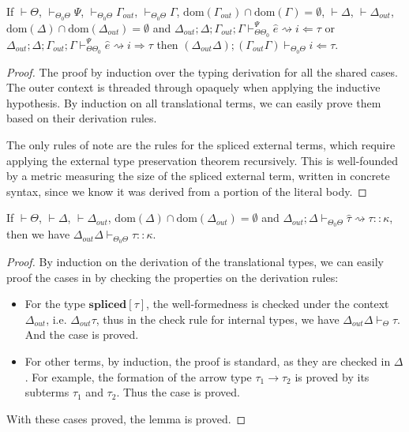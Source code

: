 \documentclass{sig-alternate}[10pt]
\begin{document}
\begin{lemma}
If $\vdash\Theta$, $\vdash_{\Theta_0\Theta} \Psi$, $\vdash_{\Theta_0\Theta}\Gamma_{out}$, $\vdash_{\Theta_0\Theta}\Gamma$, $\text{dom}(\Gamma_{out})\cap \text{dom}(\Gamma)=\emptyset$, $\vdash\Delta$, $\vdash\Delta_{out}$, $\text{dom}(\Delta)\cap\text{dom}(\Delta_{out})=\emptyset$ and $\Delta_{out};\Delta;\Gamma_{out};\Gamma\vdash_{\Theta\Theta_0}^{\Psi}\hat{e}\rightsquigarrow i\Leftarrow\tau$ or $\Delta_{out};\Delta;\Gamma_{out};\Gamma\vdash_{\Theta\Theta_0}^{\Psi}\hat{e}\rightsquigarrow i\Rightarrow \tau$ then $(\Delta_{out}\Delta);(\Gamma_{out}\Gamma)\vdash_{\Theta_0\Theta}i\Leftarrow \tau$.
\end{lemma}
\begin{proof}
The proof by induction over the typing derivation for all the shared cases. The outer context is threaded through opaquely when applying the inductive hypothesis. By induction on all translational terms, we can easily prove them based on their derivation rules.

The only rules of note are the rules for the spliced external terms, which require applying the external type preservation theorem recursively.
This is well-founded by a metric measuring the size of the spliced external term, written
in concrete syntax, since we know it was derived from a portion of the literal body.
\end{proof}

\begin{lemma}
If $\vdash\Theta$, $\vdash\Delta$, $\vdash\Delta_{out}$, $\text{dom}(\Delta)\cap\text{dom}(\Delta_{out})=\emptyset$ and $\Delta_{out};\Delta\vdash_{\Theta_0\Theta}\hat\tau\rightsquigarrow\tau::\kappa$, then we have $\Delta_{out}\Delta\vdash_{\Theta_0\Theta}\tau::\kappa$.
\end{lemma}
\begin{proof}
By induction on the derivation of the translational types, we can easily proof the cases in by checking the properties on the derivation rules:
\begin{itemize}
\item For the type $\mathbf{spliced}[\tau]$, the well-formedness is checked under the context $\Delta_{out}$, i.e. $\Delta_{out}\tau$, thus in the check rule for internal types, we have $\Delta_{out}\Delta\vdash_{\Theta}\tau$. And the case is proved.
\item For other terms, by induction, the proof is standard, as they are checked in $\Delta$. For example, the formation of the arrow type $\tau_1\rightarrow\tau_2$ is proved by its subterms $\tau_1$ and $\tau_2$. Thus the case is proved.
\end{itemize}
With these cases proved, the lemma is proved.
\end{proof}
\end{document}
